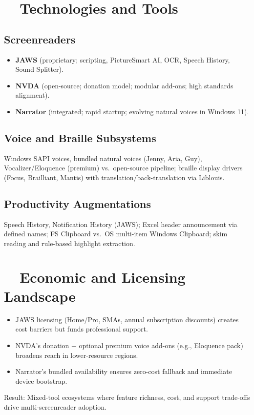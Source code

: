 \section{~~Technologies and Tools}
\label{sec:sr25-technologies}
\subsection*{Screenreaders}
\begin{itemize}
	\item \textbf{JAWS} (proprietary; scripting, PictureSmart AI, OCR, Speech History, Sound Splitter)\supercite{kingsbury2025}.
	\item \textbf{NVDA} (open-source; donation model; modular add-ons; high standards alignment)\supercite{kingsbury2025}.
	\item \textbf{Narrator} (integrated; rapid startup; evolving natural voices in Windows 11)\supercite{kingsbury2025}.
\end{itemize}

\subsection*{Voice and Braille Subsystems}
Windows SAPI voices, bundled natural voices (Jenny, Aria, Guy), Vocalizer/Eloquence (premium) vs.\ open-source pipeline; braille display drivers (Focus, Brailliant, Mantis) with translation/back-translation via Liblouis.

\subsection*{Productivity Augmentations}
Speech History, Notification History (JAWS); Excel header announcement via defined names; FS Clipboard vs.\ OS multi-item Windows Clipboard; skim reading and rule-based highlight extraction.

\section{~~Economic and Licensing Landscape}
\label{sec:sr25-economics}
\begin{itemize}
	\item JAWS licensing (Home/Pro, SMAs, annual subscription discounts) creates cost barriers but funds professional support.
	\item NVDA’s donation + optional premium voice add-ons (e.g., Eloquence pack) broadens reach in lower-resource regions.
	\item Narrator’s bundled availability ensures zero-cost fallback and immediate device bootstrap.
\end{itemize}
Result: Mixed-tool ecosystems where feature richness, cost, and support trade-offs drive multi-screenreader adoption.

